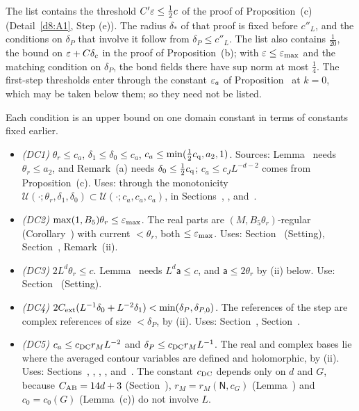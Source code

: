 \begin{detail}
\begin{step}
The list contains the threshold $C'\varepsilon\le\frac12c$ of the proof of Proposition~(c) (Detail~\ref{d8:A1}, Step (e)). The radius $\delta_*$ of that proof is fixed before $c''_L$, and the conditions on $\delta_P$ that involve it follow from $\delta_P\le c''_L$. The list also contains $\frac1{20}$, the bound on $\varepsilon+C\delta_c$ in the proof of Proposition~(b); with $\varepsilon\le\varepsilon_{\max}$ and the matching condition on $\delta_P$, the bond fields there have sup norm at most $\frac14$. The first-step thresholds enter through the constant $\varepsilon_a$ of Proposition~ at $k=0$, which may be taken below them; so they need not be listed.
\end{step}
\begin{step}
Each condition is an upper bound on one domain constant in terms of constants fixed earlier.
\begin{itemize}
\item \emph{(DC1)} $\theta_r\le c_a$, $\delta_1\le\delta_0\le c_a$, $c_a\le\min(\frac12c_{\rm q},a_2,1)$. Sources: Lemma~ needs $\theta_r\le a_2$, and Remark~(a) needs $\delta_0\le\frac12c_{\rm q}$; $c_a\le c_JL^{-d-2}$ comes from Proposition~(c). Uses: through the monotonicity $\mathcal U(\cdot;\theta_r,\delta_1,\delta_0)\subset\mathcal U(\cdot;c_a,c_a,c_a)$, in Sections~, ,  and~.
\item \emph{(DC2)} $\max(1,B_5)\theta_r\le\varepsilon_{\max}$. The real parts are $(M,B_5\theta_r)$-regular (Corollary~) with current $<\theta_r$, both $\le\varepsilon_{\max}$. Uses: Section~ (Setting), Section~, Remark~(ii).
\item \emph{(DC3)} $2L^d\theta_r\le c$. Lemma~ needs $L^d\mathsf a\le c$, and $\mathsf a\le2\theta_r$ by (ii) below. Use: Section~ (Setting).
\item \emph{(DC4)} $2C_{\rm ext}(L^{-1}\delta_0+L^{-2}\delta_1)<\min(\delta_P,\delta_{P,0})$. The references of the step are complex references of size $<\delta_P$, by (ii). Uses: Section~, Section~.
\item \emph{(DC5)} $c_a\le c_{\rm DC}r_ML^{-2}$ and $\delta_P\le c_{\rm DC}r_ML^{-1}$. The real and complex bases lie where the averaged contour variables are defined and holomorphic, by (ii). Uses: Sections~, , , ,  and~. The constant $c_{\rm DC}$ depends only on $d$ and $G$, because $C_{\rm AB}=14d+3$ (Section~), $r_M=r_M(\mathsf N,c_G)$ (Lemma~) and $c_0=c_0(G)$ (Lemma~(c)) do not involve $L$.

\end{itemize}
\end{step}
\end{detail}
